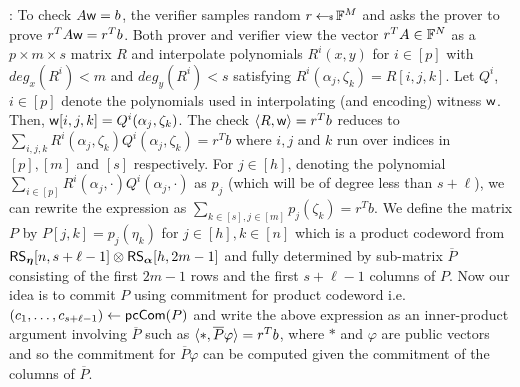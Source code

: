 \smallskip

: To check $A\mathsf{w}=b$, the verifier 
samples random $r\hskip2.3pt{\gets\!\!\mbox{\tiny${\$}$\normalsize}}\, \mathbb{F}^M$ and asks the prover to prove $r^TA\mathsf{w}=r^Tb$.
Both prover and verifier view the
vector $r^TA\in \mathbb{F}^N$ as a $p\times m\times s$ matrix $R$ and interpolate
polynomials $R^i(x,y)$ for $i\in [p]$ with $deg_x(R^i)<m$ and $deg_y(R^i)<s$
satisfying $R^i(\alpha_j,\zeta_k)=R[i,j,k]$. Let $Q^i$, $i\in [p]$ denote the
polynomials used in interpolating (and encoding) witness $\mathsf{w}$. Then, 
$\mathsf{w}[i,j,k]=Q^i(\alpha_j,\zeta_k)$. The check $\langle R,\mathsf{w}\rangle=r^Tb$ reduces to
$\sum_{i,j,k}R^i(\alpha_j,\zeta_k)Q^i(\alpha_j,\zeta_k)=r^Tb$ where $i,j$ and
$k$ run over indices in $[p],[m]$ and $[s]$ respectively. 
For $j\in [h]$, denoting  the polynomial $\sum_{i\in
[p]}R^i(\alpha_j,\cdot)Q^i(\alpha_j,\cdot)$ as $p_j$ (which will be of degree
less than $s + \ell$), we can rewrite the expression as
$\sum_{k\in[s], j\in[m]}p_j(\zeta_k)= r^Tb$.  We define the matrix $P$ by
$P[j,k]=p_j(\eta_k)$ for $j\in [h],k\in [n]$ which is a product codeword from
$\mathsf{RS}_{\bm{\eta}}[n,s+\ell-1] \otimes \mathsf{RS}_{\bm{\alpha}}[h,2m-1]$ and fully determined by
sub-matrix $\overline{P}$ consisting of the first $2m-1$ rows and the first
$s+\ell-1$ columns of $P$. Now our idea is to commit  $P$ using  commitment for
product codeword i.e. $(c_1,\ldots,c_{s+\ell-1}) \gets \mathsf{pcCom}(P)$ and write the
above expression as an inner-product argument involving $\overline{P}$ such as
$\langle *,\overline{P}\varphi\rangle = r^Tb$, where $*$ and $\varphi$ are public vectors 
 and so the commitment for $\overline{P} \varphi$ can
be computed given the commitment of the columns of $\overline{P}$.

